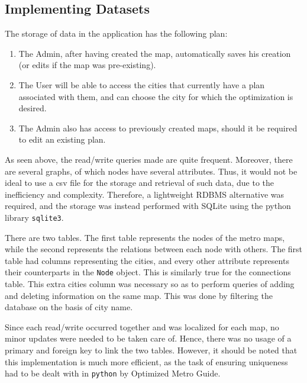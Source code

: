 \documentclass[fontsize=11pt]{article}
\begin{document}
    \subsection*{Implementing Datasets}
    The storage of data in the application has the following plan:

    \begin{enumerate}
        \item The Admin, after having created the map, automatically saves his creation (or edits if the map was pre-existing).

        \item The User will be able to access the cities that currently have a plan associated with them, and can choose the city for which the optimization is desired.

        \item The Admin also has access to previously created maps, should it be required to edit an existing plan.
    \end{enumerate}

    As seen above, the read/write queries made are quite frequent. Moreover, there are several graphs, of which nodes have several attributes. Thus, it would not be ideal to use a csv file for the storage and retrieval of such data, due to the inefficiency and complexity. Therefore, a lightweight RDBMS alternative was required, and the storage was instead performed with SQLite using the python library \texttt{sqlite3}.

    There are two tables. The first table represents the nodes of the metro maps, while the second represents the relations between each node with others. The first table had columns representing the cities, and every other attribute represents their counterparts in the \texttt{Node} object. This is similarly true for the connections table. This extra cities column was necessary so as to perform queries of adding and deleting information on the same map. This was done by filtering the database on the basis of city name.

    Since each read/write occurred together and was localized for each map,  no minor updates were needed to be taken care of. Hence, there was no usage of a primary and foreign key to link the two tables. However, it should be noted that this implementation is much more efficient, as the task of ensuring uniqueness had to be dealt with in \texttt{python} by Optimized Metro Guide.
\end{document}
